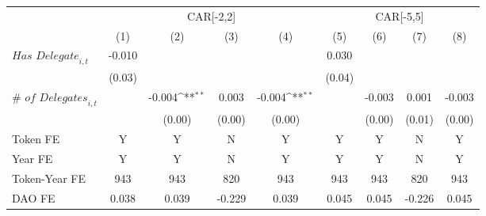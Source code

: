 {
\def\sym#1{\ifmmode^{#1}\else\(^{#1}\)\fi}
\begin{tabular}{l*{8}{c}}
\toprule
                    &\multicolumn{4}{c}{CAR[-2,2]}                                                          &\multicolumn{4}{c}{CAR[-5,5]}                                                          \\\cmidrule(lr){2-5}\cmidrule(lr){6-9}
                    &\multicolumn{1}{c}{(1)}         &\multicolumn{1}{c}{(2)}         &\multicolumn{1}{c}{(3)}         &\multicolumn{1}{c}{(4)}         &\multicolumn{1}{c}{(5)}         &\multicolumn{1}{c}{(6)}         &\multicolumn{1}{c}{(7)}         &\multicolumn{1}{c}{(8)}         \\
\midrule
$\textit{Has Delegate}_{i,t}$&      -0.010         &                     &                     &                     &       0.030         &                     &                     &                     \\
                    &      (0.03)         &                     &                     &                     &      (0.04)         &                     &                     &                     \\
$\textit{# of Delegates}_{i,t}$&                     &      -0.004\sym{**} &       0.003         &      -0.004\sym{**} &                     &      -0.003         &       0.001         &      -0.003         \\
                    &                     &      (0.00)         &      (0.00)         &      (0.00)         &                     &      (0.00)         &      (0.01)         &      (0.00)         \\
\midrule
Token FE            &           Y         &           Y         &           N         &           Y         &           Y         &           Y         &           N         &           Y         \\
Year FE             &           Y         &           Y         &           N         &           Y         &           Y         &           Y         &           N         &           Y         \\
Token-Year FE       &         943         &         943         &         820         &         943         &         943         &         943         &         820         &         943         \\
DAO FE              &       0.038         &       0.039         &      -0.229         &       0.039         &       0.045         &       0.045         &      -0.226         &       0.045         \\
\bottomrule
\end{tabular}
}
